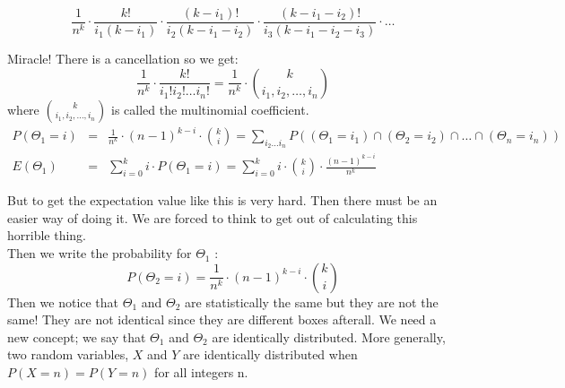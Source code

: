 \begin{equation}
\frac{1}{n^{k}} \cdot \frac{k!}{i_{1}(k-i_{1})} \cdot \frac{(k-i_{1})!}{i_{2}(k-i_{1}-i_{2})} \cdot \frac{(k-i_{1}-i_{2})!}{i_{3}(k-i_{1}-i_{2}-i_{3})} \cdot \ldots
\end{equation}

Miracle! There is a cancellation so we get:
\begin{equation}
\frac{1}{n^{k}} \cdot \frac{k!}{i_{1}! i_{2}! \ldots i_{n}!} = \frac{1}{n^{k}} \cdot {{k} \choose {i_{1}, i_{2}, \ldots , i_{n}}}
\end{equation}
where ${{k} \choose {i_{1}, i_{2}, \ldots , i_{n}}}$ is called the multinomial
coefficient.
\begin{eqnarray*}
P(\Theta_{1}=i) &=& \frac{1}{n^{k}} \cdot (n-1)^{k-i} \cdot
{{k} \choose {i}} = \sum_{i_{2} \ldots i_{n}}P((\Theta_{1} = i_{1}) \cap
(\Theta_{2}=i_{2}) \cap \ldots \cap (\Theta_{n}=i_{n})) \\
E(\Theta_{1}) &=& \sum_{i=0}^{k} i \cdot P(\Theta_{1}=i) =
\sum_{i=0}^{k} i \cdot {{k} \choose {i}} \cdot \frac{(n-1)^{k-i}}{n^{k}}
\end{eqnarray*}

But to get the expectation value like this is very hard. Then there
must be an easier way of doing it. We are forced to think to get out
of calculating this horrible thing.\\
Then we write the probability for $\Theta_{1}$ :
\begin{equation}
P(\Theta_{2}=i) = \frac{1}{n^{k}} \cdot (n-1)^{k-i} \cdot
{{k} \choose {i}}
\end{equation}
Then we notice that $\Theta_{1}$ and $\Theta_{2}$ are statistically
the same but they are not the same! They are not identical since they
are different boxes afterall. We need a new concept; we say that
$\Theta_{1}$ and $\Theta_{2}$ are identically distributed. More
generally, two random variables, $X$ and $Y$ are identically
distributed when $P(X=n)=P(Y=n)$ for all integers n.

